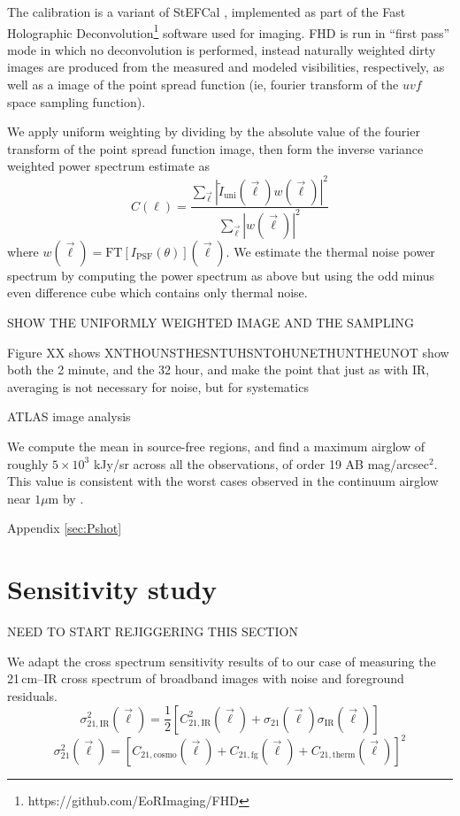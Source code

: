 \documentclass{emulateapj}
\newcommand{\IR}{\text{IR}}
\newcommand{\therm}{\text{therm}}
\newcommand{\cosmo}{\text{cosmo}}
\newcommand{\fg}{\text{fg}}
\begin{document}
The calibration is a variant of StEFCal \citep{stefcal}, implemented as part of the Fast Holographic Deconvolution\footnote{https://github.com/EoRImaging/FHD} \citep{fhd} software used for imaging. FHD is run in ``first pass'' mode in which no deconvolution is performed, instead naturally weighted dirty images are produced from the measured and modeled visibilities, respectively, as well as a image of the point spread function (ie, fourier transform of the $uvf$ space sampling function). 

We apply uniform weighting by dividing by the absolute value of the fourier transform of the point spread function image, then form the inverse variance weighted power spectrum estimate as
\begin{equation}
	C(\ell)=\frac{\sum_{\vec{\ell}}|\tilde{I}_\text{uni}(\vec{\ell})w(\vec{\ell})|^2}{\sum_{\vec{\ell}}|w(\vec{\ell})|^2}
\end{equation}
where $w(\vec{\ell})=\text{FT}[I_\text{PSF}(\theta)](\vec{\ell})$. We estimate the thermal noise power spectrum by computing the power spectrum as above but using the odd minus even difference cube which contains only thermal noise.

SHOW THE UNIFORMLY WEIGHTED IMAGE AND THE SAMPLING

Figure XX shows XNTHOUNSTHESNTUHSNTOHUNETHUNTHEUNOT
	show both the 2 minute, and the 32 hour, and make the point that just as with IR, averaging is not necessary for noise, but for systematics



ATLAS image analysis



We compute the mean in source-free regions, and find a maximum airglow of roughly $5\times10^3$ kJy/sr across all the observations, of order 19 AB mag/arcsec$^2$. This value is consistent with the worst cases observed in the continuum airglow near $1\mu$m by \citet{sullivan12}.

Appendix \ref{sec:Pshot}

\section{Sensitivity study}




NEED TO START REJIGGERING THIS SECTION

We adapt the cross spectrum sensitivity results of \citet{lidz09} to our case of measuring the 21\,cm--IR cross spectrum of broadband images with noise and foreground residuals. 
\begin{equation}
\label{eqn:sense1}
	\sigma_{21,\IR}^2(\vec{\ell})=\frac{1}{2}[C^2_{21,\IR}(\vec{\ell})+\sigma_{21}(\vec{\ell})\sigma_{\IR}(\vec{\ell})]
\end{equation}
\begin{equation}
\label{eqn:sense2}
	\sigma_{21}^2(\vec{\ell})=[C_{21,\cosmo}(\vec{\ell})+C_{21,\fg}(\vec{\ell})+C_{21,\therm}(\vec{\ell})]^2
\end{equation}
\end{document}
